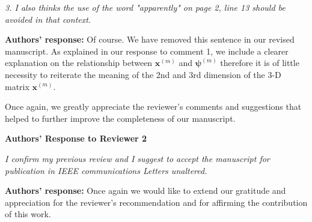 \documentclass[onecolumn, 11pt, draftclsnofoot]{IEEEtran}
\begin{document}
\vspace{0.5cm}

\noindent
\emph{3. I also thinks the use of the word "apparently" on page 2, line 13
should be avoided in that context.}

\noindent \textbf{Authors' response:}
Of course. We have removed this sentence in our revised manuscript. As explained
in our response to comment 1, we include a clearer explanation on the
relationship between $\mathbf{x}^{(m)}$ and $\bm{\psi}^{(m)}$ therefore it is
of little necessity to reiterate the meaning of the 2nd and 3rd dimension of
the 3-D matrix $\mathbf{x}^{(m)}$.


\vspace{0.5cm}



Once again, we greatly appreciate the reviewer's comments and suggestions
that helped to further improve the completeness of our manuscript.

\newpage
\begin{center}
{\LARGE \textbf{Authors' Response to Reviewer 2}}
\end{center}

\noindent
\emph{I confirm my previous review and I suggest to accept the manuscript for
publication in IEEE communications Letters unaltered.}

\noindent \textbf{Authors' response:}
Once again we would like to extend our gratitude and appreciation for the
reviewer's recommendation and for affirming the contribution of this work.

\vspace{0.5cm}



\end{document}
